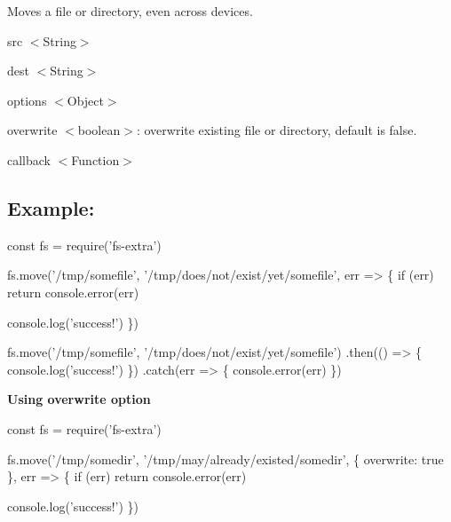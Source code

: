 Moves a file or directory, even across devices.


\begin{DoxyItemize}
\item {\ttfamily src} {\ttfamily $<$String$>$}
\item {\ttfamily dest} {\ttfamily $<$String$>$}
\item {\ttfamily options} {\ttfamily $<$Object$>$}
\begin{DoxyItemize}
\item {\ttfamily overwrite} {\ttfamily $<$boolean$>$}\+: overwrite existing file or directory, default is {\ttfamily false}.
\end{DoxyItemize}
\item {\ttfamily callback} {\ttfamily $<$Function$>$}
\end{DoxyItemize}

\subsection*{Example\+:}


\begin{DoxyCode}
const fs = require('fs-extra')

fs.move('/tmp/somefile', '/tmp/does/not/exist/yet/somefile', err => \{
  if (err) return console.error(err)

  console.log('success!')
\})

fs.move('/tmp/somefile', '/tmp/does/not/exist/yet/somefile')
.then(() => \{
  console.log('success!')
\})
.catch(err => \{
  console.error(err)
\})
\end{DoxyCode}


{\bfseries Using {\ttfamily overwrite} option}


\begin{DoxyCode}
const fs = require('fs-extra')

fs.move('/tmp/somedir', '/tmp/may/already/existed/somedir', \{ overwrite: true \}, err => \{
  if (err) return console.error(err)

  console.log('success!')
\})
\end{DoxyCode}
 
